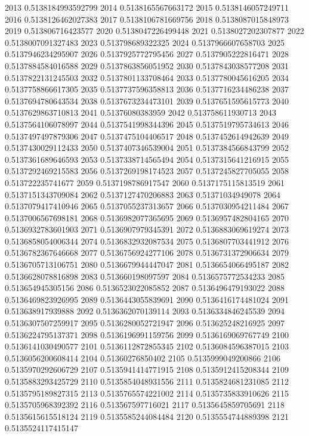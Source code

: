 2013 0.5138184993592799
2014 0.5138165567663172
2015 0.5138146057249711
2016 0.5138126462027383
2017 0.5138106781669756
2018 0.5138087015848973
2019 0.513806716423577
2020 0.5138047226499448
2021 0.5138027202307877
2022 0.5138007091327483
2023 0.513798689322325
2024 0.5137966607658703
2025 0.5137946234295907
2026 0.5137925772795456
2027 0.5137905222816471
2028 0.5137884584016588
2029 0.5137863856051952
2030 0.5137843038577208
2031 0.5137822131245503
2032 0.5137801133708464
2033 0.5137780045616205
2034 0.5137758866617305
2035 0.5137737596358813
2036 0.5137716234486238
2037 0.5137694780643534
2038 0.5137673234473101
2039 0.5137651595615773
2040 0.5137629863710813
2041 0.51376080383959
2042 0.513758611930713
2043 0.5137564106078997
2044 0.5137541998344396
2045 0.5137519795734613
2046 0.5137497497879306
2047 0.5137475104406517
2048 0.5137452614942639
2049 0.5137430029112433
2050 0.5137407346539004
2051 0.5137384566843799
2052 0.5137361689646593
2053 0.5137338714565494
2054 0.5137315641216915
2055 0.5137292469215583
2056 0.5137269198174523
2057 0.5137245827705055
2058 0.513722235741677
2059 0.5137198786917547
2060 0.5137175115813519
2061 0.5137151343709084
2062 0.5137127470206883
2063 0.51371034949078
2064 0.5137079417410946
2065 0.5137055237313657
2066 0.5137030954211484
2067 0.5137006567698181
2068 0.5136982077365695
2069 0.5136957482804165
2070 0.5136932783601903
2071 0.5136907979345391
2072 0.5136883069619274
2073 0.5136858054006344
2074 0.5136832932087534
2075 0.5136807703441912
2076 0.5136782367646668
2077 0.5136756924277106
2078 0.5136731372906634
2079 0.5136705713106751
2080 0.5136679944447047
2081 0.5136654066495187
2082 0.5136628078816898
2083 0.513660198097597
2084 0.5136575772534233
2085 0.513654945305156
2086 0.5136523022085852
2087 0.5136496479193022
2088 0.5136469823926995
2089 0.5136443055839691
2090 0.5136416174481024
2091 0.513638917939888
2092 0.5136362070139114
2093 0.5136334846245539
2094 0.5136307507259917
2095 0.5136280052721947
2096 0.513625248216925
2097 0.5136224795137371
2098 0.5136196991159756
2099 0.5136169069767749
2100 0.5136141030490577
2101 0.5136112872855345
2102 0.5136084596387015
2103 0.5136056200608414
2104 0.51360276850402
2105 0.5135999049200866
2106 0.5135970292606729
2107 0.5135941414771915
2108 0.5135912415208344
2109 0.5135883293425729
2110 0.5135854048931556
2111 0.5135824681231085
2112 0.5135795189827315
2113 0.5135765574221002
2114 0.5135735833910626
2115 0.5135705968392392
2116 0.513567597716021
2117 0.5135645859705691
2118 0.5135615615518124
2119 0.5135585244084484
2120 0.5135554744889398
2121 0.5135524117415147
